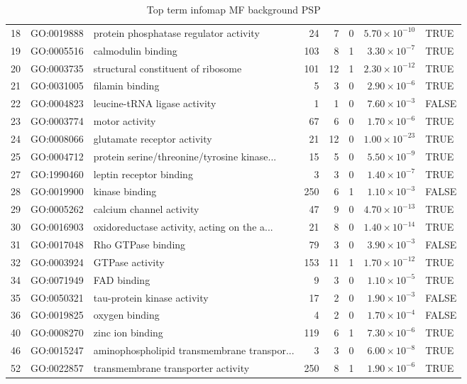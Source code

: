 \begin{table}[ht]
\begin{adjustbox}{max width=\textwidth}
\begin{tabular}{lllrrrrl}
  18 & GO:0019888 & protein phosphatase regulator activity & 24 & 7 & 0 & $5.70 \times 10^{-10}$ & TRUE \\ 
  19 & GO:0005516 & calmodulin binding & 103 & 8 & 1 & $3.30 \times 10^{-7}$ & TRUE \\ 
  20 & GO:0003735 & structural constituent of ribosome & 101 & 12 & 1 & $2.30 \times 10^{-12}$ & TRUE \\ 
  21 & GO:0031005 & filamin binding & 5 & 3 & 0 & $2.90 \times 10^{-6}$ & TRUE \\ 
  22 & GO:0004823 & leucine-tRNA ligase activity & 1 & 1 & 0 & $7.60 \times 10^{-3}$ & FALSE \\ 
  23 & GO:0003774 & motor activity & 67 & 6 & 0 & $1.70 \times 10^{-6}$ & TRUE \\ 
  24 & GO:0008066 & glutamate receptor activity & 21 & 12 & 0 & $1.00 \times 10^{-23}$ & TRUE \\ 
  25 & GO:0004712 & protein serine/threonine/tyrosine kinase... & 15 & 5 & 0 & $5.50 \times 10^{-9}$ & TRUE \\ 
  27 & GO:1990460 & leptin receptor binding & 3 & 3 & 0 & $1.40 \times 10^{-7}$ & TRUE \\ 
  28 & GO:0019900 & kinase binding & 250 & 6 & 1 & $1.10 \times 10^{-3}$ & FALSE \\ 
  29 & GO:0005262 & calcium channel activity & 47 & 9 & 0 & $4.70 \times 10^{-13}$ & TRUE \\ 
  30 & GO:0016903 & oxidoreductase activity, acting on the a... & 21 & 8 & 0 & $1.40 \times 10^{-14}$ & TRUE \\ 
  31 & GO:0017048 & Rho GTPase binding & 79 & 3 & 0 & $3.90 \times 10^{-3}$ & FALSE \\ 
  32 & GO:0003924 & GTPase activity & 153 & 11 & 1 & $1.70 \times 10^{-12}$ & TRUE \\ 
  34 & GO:0071949 & FAD binding & 9 & 3 & 0 & $1.10 \times 10^{-5}$ & TRUE \\ 
  35 & GO:0050321 & tau-protein kinase activity & 17 & 2 & 0 & $1.90 \times 10^{-3}$ & FALSE \\ 
  36 & GO:0019825 & oxygen binding & 4 & 2 & 0 & $1.70 \times 10^{-4}$ & FALSE \\ 
  40 & GO:0008270 & zinc ion binding & 119 & 6 & 1 & $7.30 \times 10^{-6}$ & TRUE \\ 
  46 & GO:0015247 & aminophospholipid transmembrane transpor... & 3 & 3 & 0 & $6.00 \times 10^{-8}$ & TRUE \\ 
  52 & GO:0022857 & transmembrane transporter activity & 250 & 8 & 1 & $1.90 \times 10^{-6}$ & TRUE \\ 
   \hline
\end{tabular}
\end{adjustbox}
\caption{Top term  infomap MF background PSP} 
\label{tab:Top term  infomap MF background PSP}
\end{table}
